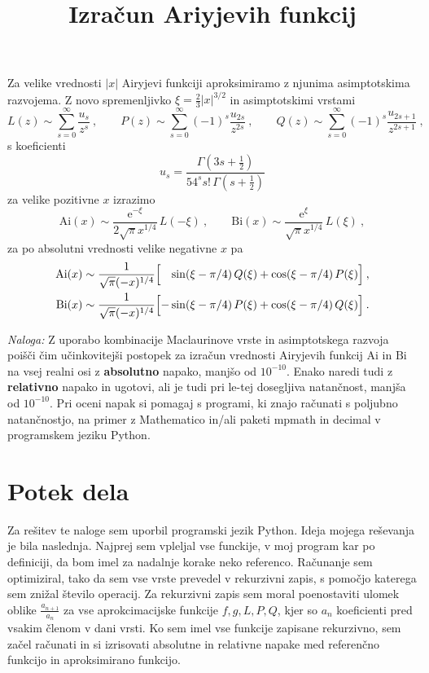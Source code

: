 \documentclass{article}
\newcommand{\Ai}{\mathrm{Ai}}
\newcommand{\Bi}{\mathrm{Bi}}
\theoremstyle{definition}
\theoremstyle{plain}
\numberwithin{definition}{section}
\numberwithin{theorem}{section} \title{Izračun Ariyjevih funkcij}
\begin{document}
Za velike vrednosti $|x|$ Airyjevi funkciji aproksimiramo
z njunima asimp\-tot\-ski\-ma razvojema.  Z novo spremenljivko
$\xi=\frac{2}{3} |x|^{3/2}$ in asimptotskimi vrstami
%
\begin{equation*}
  L(z) \sim \sum_{s=0}^\infty \frac{u_s}{z^s}\>,\qquad
  P(z) \sim \sum_{s=0}^\infty (-1)^s \frac{u_{2s}}{z^{2 s}}\>,\qquad
  Q(z) \sim \sum_{s=0}^\infty (-1)^s \frac{u_{2s+1}}{z^{2 s+1}}\>,
\end{equation*}
s koeficienti
\begin{equation*}
u_s = \frac{ \Gamma(3s + \frac{1}{2})}
        {54^s s!\, \Gamma(s + \frac{1}{2}) }
\end{equation*}
za velike pozitivne $x$ izrazimo
%
\begin{equation*}
\Ai(x)\sim  \frac{\mathrm{e}^{-\xi}}{2\sqrt{\pi} x^{1/4}} \, L(-\xi) \>, \qquad
\Bi(x)\sim  \frac{\mathrm{e}^{\xi}} { \sqrt{\pi} x^{1/4}} \, L(\xi)\>,
\end{equation*}
%
za po absolutni vrednosti velike negativne $x$ pa
%
%
\begin{align*}
    \Ai(x)&\sim  \frac{1}{\sqrt{\pi} (-x)^{1/4}}
    \Bigl[ \phantom{-}\sin(\xi-\pi/4) \, Q(\xi)
                    + \cos(\xi-\pi/4) \, P(\xi)\Bigr] \>, \\
    \Bi(x)&\sim  \frac{1}{\sqrt{\pi} (-x)^{1/4}}
    \Bigl[ - \sin(\xi-\pi/4) \, P(\xi)
      + \cos(\xi-\pi/4) \, Q(\xi)\Bigr]\>.
\end{align*}

\bigskip

{\sl Naloga:} Z uporabo kombinacije Maclaurinove vrste in asimptotskega
razvoja poišči čim učinkovitejši postopek za izračun
vrednosti Airyjevih funkcij $\Ai$ in $\Bi$ na vsej real\-ni osi
z {\bf absolutno} napako, manjšo od $10^{-10}$. Enako naredi tudi z {\bf relativno} napako in ugotovi,
ali je tudi pri le-tej dosegljiva natančnost, manjša od $10^{-10}$.
Pri oceni napak si po\-ma\-gaj s programi, ki znajo računati s poljubno
natančnostjo, na primer z {\sc Mathematico} in/ali paketi {\sc mpmath} in {\sc decimal} v programskem
jeziku {\sc Python}.

\section{Potek dela}
Za rešitev te naloge sem uporbil programski jezik Python. 
Ideja mojega reševanja je bila naslednja. Najprej sem vpleljal vse funckije, 
v moj program kar po definiciji, 
da bom imel za nadalnje korake neko referenco. Računanje sem optimiziral,
tako da sem vse vrste prevedel v rekurzivni zapis, s pomočjo katerega sem
znižal število operacij. Za rekurzivni zapis sem moral poenostaviti
ulomek oblike $\frac{a_{n+1}}{a_n}$ za vse aprokcimacijske funkcije 
$f, g, L, P, Q$, kjer so $a_n$ koeficienti pred vsakim členom v dani vrsti.
Ko sem imel vse funkcije zapisane rekurzivno, sem začel računati 
in si izrisovati absolutne in relativne napake med referenčno funkcijo in 
aproksimirano funkcijo. 
\end{document}
